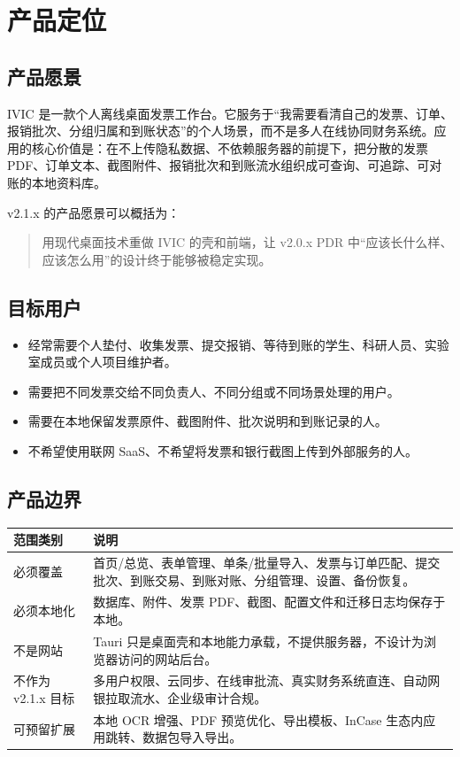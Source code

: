 \documentclass[UTF8,zihao=-4]{ctexart}
\begin{document}
\section{产品定位}

\subsection{产品愿景}

IVIC 是一款个人离线桌面发票工作台。它服务于“我需要看清自己的发票、订单、报销批次、分组归属和到账状态”的个人场景，而不是多人在线协同财务系统。应用的核心价值是：在不上传隐私数据、不依赖服务器的前提下，把分散的发票 PDF、订单文本、截图附件、报销批次和到账流水组织成可查询、可追踪、可对账的本地资料库。

v2.1.x 的产品愿景可以概括为：

\begin{quote}
  用现代桌面技术重做 IVIC 的壳和前端，让 v2.0.x PDR 中“应该长什么样、应该怎么用”的设计终于能够被稳定实现。
\end{quote}

\subsection{目标用户}

\begin{itemize}
  \item 经常需要个人垫付、收集发票、提交报销、等待到账的学生、科研人员、实验室成员或个人项目维护者。
  \item 需要把不同发票交给不同负责人、不同分组或不同场景处理的用户。
  \item 需要在本地保留发票原件、截图附件、批次说明和到账记录的人。
  \item 不希望使用联网 SaaS、不希望将发票和银行截图上传到外部服务的人。
\end{itemize}

\subsection{产品边界}

\begin{longtable}{p{4.0cm}p{10.4cm}}
\toprule
范围类别 & 说明 \\
\midrule
必须覆盖 & 首页/总览、表单管理、单条/批量导入、发票与订单匹配、提交批次、到账交易、到账对账、分组管理、设置、备份恢复。 \\
必须本地化 & 数据库、附件、发票 PDF、截图、配置文件和迁移日志均保存于本地。 \\
不是网站 & Tauri 只是桌面壳和本地能力承载，不提供服务器，不设计为浏览器访问的网站后台。 \\
不作为 v2.1.x 目标 & 多用户权限、云同步、在线审批流、真实财务系统直连、自动网银拉取流水、企业级审计合规。 \\
可预留扩展 & 本地 OCR 增强、PDF 预览优化、导出模板、InCase 生态内应用跳转、数据包导入导出。 \\
\bottomrule
\end{longtable}
\end{document}
